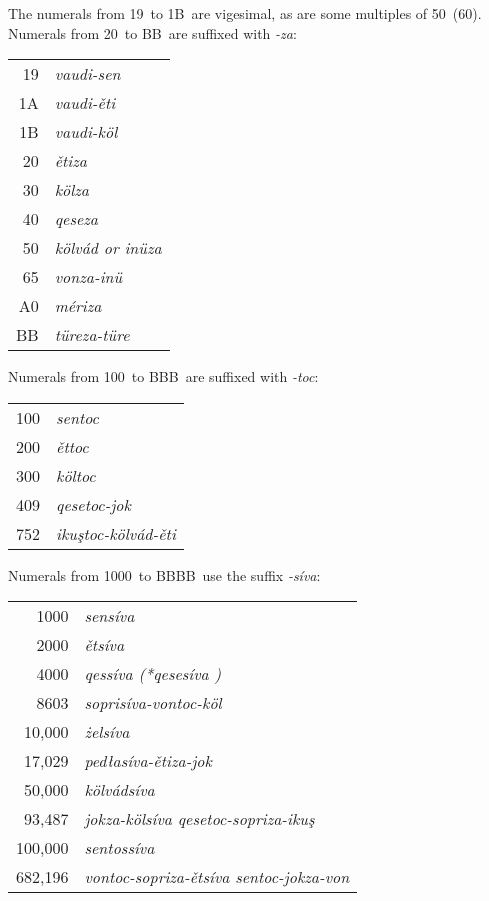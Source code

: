 \documentclass[grammar]{subfiles}
\begin{document}
	\newpage
	The numerals from 19\duo\ to 1B\duo\ are vigesimal, as are some multiples of 50\duo\ (60\dec). Numerals from 20\duo\ to BB\duo\ are suffixed with \emph{-za}:

	\begin{exe}
		\ex
		\begin{tabular}[t]{r >{\itshape}l}
			19\duo & vaudi-sen\\
			1A\duo & vaudi-ěti\\
			1B\duo & vaudi-köl\\
			20\duo & ětiza\\
			30\duo & kölza\\
			40\duo & qeseza\\
			50\duo & kölvád \textup{or} inüza\\
			65\duo & vonza-inü\\
			A0\duo & mériza\\
			BB\duo & türeza-türe\\
		\end{tabular}
	\end{exe}

	Numerals from 100\duo\ to BBB\duo\ are suffixed with \emph{-toc}:

	\begin{exe}
		\ex
		\begin{tabular}[t]{r >{\itshape}l}
			100\duo & sentoc\\
			200\duo & ěttoc\\
			300\duo & költoc\\
			409\duo & qesetoc-jok\\
			752\duo & ikuştoc-kölvád-ěti\\
		\end{tabular}
	\end{exe}

	Numerals from 1000\duo\ to BBBB\duo\  use the suffix \emph{-síva}:

	\begin{exe}
		\ex
		\begin{tabular}[t]{r >{\itshape}l}
			1000\duo    & sensíva\\
			2000\duo    & ětsíva\\
			4000\duo    & qessíva \textup{(*\emph{qesesíva} )}\\
			8603\duo    & soprisíva-vontoc-köl\\
			10,000\duo  & żelsíva\\
			17,029\duo  & pedłasíva-ětiza-jok\\
			50,000\duo  & kölvádsíva\\
			93,487\duo  & jokza-kölsíva qesetoc-sopriza-ikuş\\
			100,000\duo & sentossíva\\
			682,196\duo & vontoc-sopriza-ětsíva sentoc-jokza-von\\
		\end{tabular}
	\end{exe}
\end{document}
